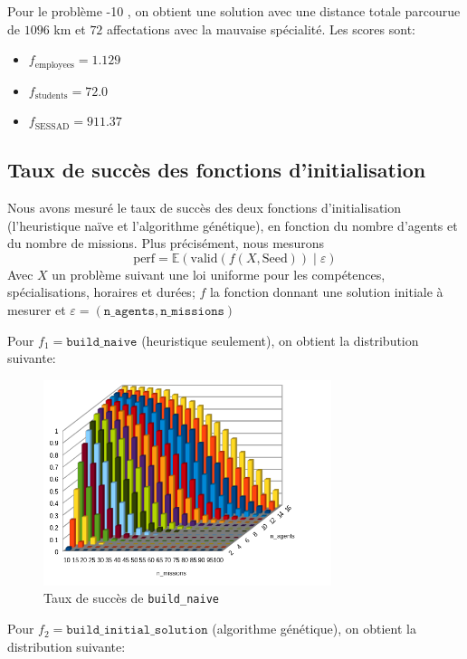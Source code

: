 \documentclass[11pt]{article}
\begin{document}
Pour le problème -10 \fg, on obtient une solution avec une distance totale parcourue de $1096$ km et $72$ affectations avec la mauvaise spécialité.
Les scores sont:

\begin{itemize}
    \item $f_{\text{employees}} = 1.129$
    \item $f_{\text{students}} = 72.0$
    \item $f_{\text{SESSAD}} = 911.37$
\end{itemize}

\subsection{Taux de succès des fonctions d'initialisation}

Nous avons mesuré le taux de succès des deux fonctions d'initialisation (l'heuristique \og naïve \fg et l'algorithme génétique), en fonction du nombre d'agents et du nombre de missions.
Plus précisément, nous mesurons
$$
\text{perf} = \mathbb{E}(\text{valid}(f(X, \text{Seed})) \;\vert\; \varepsilon)
$$
Avec $X$ un problème suivant une loi uniforme pour les compétences, spécialisations, horaires et durées; $f$ la fonction donnant une solution initiale à mesurer et $\varepsilon = (\texttt{n\_agents}, \texttt{n\_missions})$

Pour $f_1 = \texttt{build\_naive}$ (heuristique seulement), on obtient la distribution suivante:

\begin{figure}[H]
    \centering
    \includegraphics[width=0.75\textwidth]{Images/naive.png}
    \caption{Taux de succès de \texttt{build\_naive}}
    \label{fig:naive_success}
\end{figure}

Pour $f_2 = \texttt{build\_initial\_solution}$ (algorithme génétique), on obtient la distribution suivante:
\end{document}
